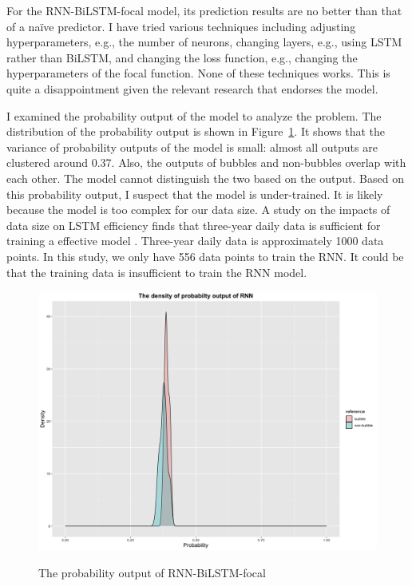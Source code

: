 \documentclass[12pt, man, a4paper, floatsintext]{apa7}
\begin{document}
For the RNN-BiLSTM-focal model, its prediction results are no better than that of a naïve predictor. I have tried various techniques including adjusting hyperparameters, e.g., the number of neurons, changing layers, e.g., using LSTM rather than BiLSTM, and changing the loss function, e.g., changing the hyperparameters of the focal function. None of these techniques works. This is quite a disappointment given the relevant research that endorses the model.

I examined the probability output of the model to analyze the problem. The distribution of the probability output is shown in Figure~\ref{fig:rnn}. It shows that the variance of probability outputs of the model is small: almost all outputs are clustered around 0.37. Also, the outputs of bubbles and non-bubbles overlap with each other. The model cannot distinguish the two based on the output. Based on this probability output, I suspect that the model is under-trained. It is likely because the model is too complex for our data size. A study on the impacts of data size on LSTM efficiency finds that three-year daily data is sufficient for training a effective model \parencite{datasize}. Three-year daily data is approximately 1000 data points. In this study, we only have 556 data points to train the RNN. It could be that the training data is insufficient to train the RNN model. 

\begin{figure}
    \centering
    \caption{The probability output of RNN-BiLSTM-focal}
    \includegraphics[width=15cm]{rnn.png}
    \label{fig:rnn}
\end{figure}
\end{document}
